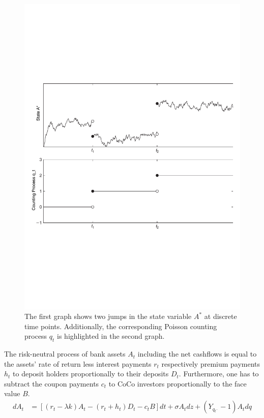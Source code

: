 \begin{figure}[ht]
 \centering
 \includegraphics[trim=0.6cm 7.05cm 0.9cm 9cm, scale = 0.4]{media/jumpprocess} \par
 \caption[Jump-diffusion process]{The first graph shows two jumps in the state variable $A^*$ at discrete time points. Additionally, the corresponding Poisson counting process $q_t$ is highlighted in the second graph. \citep{ait2009handbook}}
 \label{fig:jumpgraph}
\end{figure}

The risk-neutral process of bank assets $A_t$ including the net cashflows is equal to the assets' rate of return less interest payments $r_t$ respectively premium payments $h_t$ to deposit holders proportionally to their deposits $D_t$. Furthermore, one has to subtract the coupon payments $c_t$ to CoCo investors proportionally to the face value $B$.
\begin{align} \label{bankassetprocess2}
dA_t &= \left[ \left( r_t - \lambda k \right) A_t - \left( r_t + h_t \right) D_t - c_t B \right] dt + \sigma A_t dz + \left( Y_{q_{t^{-}}} - 1 \right) A_t dq
\end{align}

